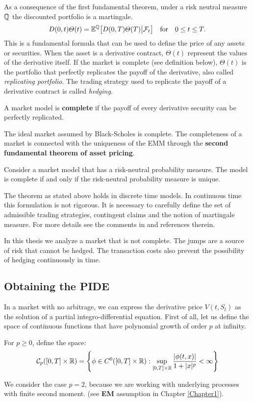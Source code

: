 As a consequence of the first fundamental theorem, under a risk neutral measure $\mathbb{Q}$ the discounted portfolio is a martingale.  
\begin{equation}\label{derivative_price}
 D(0,t) \varTheta(t) = \mathbb{E}^{\mathbb{Q}} \bigl[ D(0,T) \varTheta(T) \big| \mathcal{F}_t \bigr] \quad \mbox{for} \quad 0\leq t \leq T.
\end{equation}
This is a fundamental formula that can be used to define the price of any assets or securities. 
When the asset is a derivative contract, $\varTheta(t)$ represent the values of the derivative itself. 
If the market is complete (see definition below), $\varTheta(t)$ is the portfolio that perfectly
replicates the payoff of the derivative, also called \emph{replicating portfolio}. The trading strategy used to replicate the payoff of a derivative contract is called \emph{hedging}. 
\begin{Definition}
 A market model is \textbf{complete} if the payoff of every derivative security can be perfectly replicated. 
\end{Definition}
The ideal market assumed by Black-Scholes is complete. The completeness of a market is connected with the uniqueness of the EMM through the
\textbf{second fundamental theorem of asset pricing}.
\begin{Theorem}
 Consider a market model that has a risk-neutral probability measure. The model is complete if and only if the risk-neutral probability measure is unique.
\end{Theorem}
The theorem as stated above holds in discrete time models. In continuous time this formulation is not rigorous. 
It is necessary to carefully define the set of admissible trading strategies, contingent claims and the
notion of martingale measure. For more details see the comments in \cite{Cont} and references therein.

In this thesis we analyze a market that is not complete. The jumps are a source of risk that cannot be hedged. The transaction costs also prevent the possibility of hedging 
continuously in time.


\subsection{Obtaining the PIDE}

In a market with no arbitrage, we can express the derivative price $V(t,S_t)$ as the solution of a partial integro-differential equation.
First of all, let us define the space of continuous functions that have polynomial growth of order $p$ at infinity.
\begin{Definition}\label{Cp}
 For $p\geq 0$, define the space:
\begin{equation}
 \mathcal{C}_p([0,T] \times \mathbb{R}) = \left\{  \phi \in C^0([0,T] \times \mathbb{R}) : \sup_{[0,T] \times \mathbb{R}} 
 \frac{|\phi(t,x)|}{1+|x|^p} <\infty   \right\} 
\end{equation}
\end{Definition}
We consider the case $p=2$, because we are working with underlying processes with finite second moment. (see \textbf{EM} assumption in Chapter \ref{Chapter1}).

